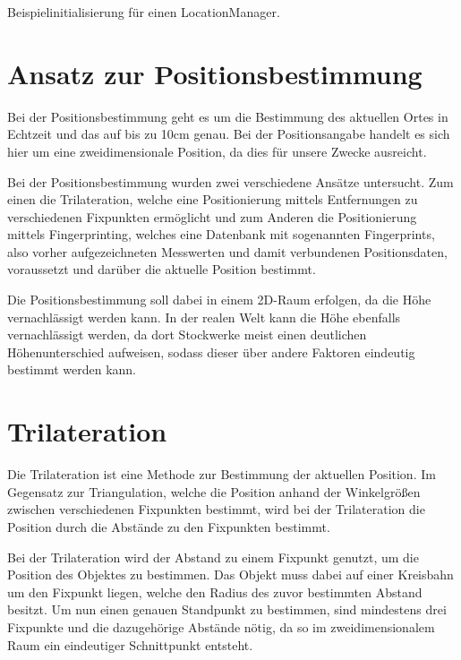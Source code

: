 \begin{listing}[htb!]
    \caption{Beispielinitialisierung für einen LocationManager.}
    \label{lst:locationmanager_objc}
\end{listing}

\section{Ansatz zur Positionsbestimmung}
\label{sec:implementation:positioning}
Bei der Positionsbestimmung geht es um die Bestimmung des aktuellen Ortes in Echtzeit und das auf bis zu 10cm genau. Bei der Positionsangabe handelt es sich hier um eine zweidimensionale Position, da dies für unsere Zwecke ausreicht.

Bei der Positionsbestimmung wurden zwei verschiedene Ansätze untersucht. Zum einen die Trilateration, welche eine Positionierung mittels Entfernungen zu verschiedenen Fixpunkten ermöglicht und zum Anderen die Positionierung mittels Fingerprinting, welches eine Datenbank mit sogenannten Fingerprints, also vorher aufgezeichneten Messwerten und damit verbundenen Positionsdaten, voraussetzt und darüber die aktuelle Position bestimmt.

Die Positionsbestimmung soll dabei in einem 2D-Raum erfolgen, da die Höhe vernachlässigt werden kann. In der realen Welt kann die Höhe ebenfalls vernachlässigt werden, da dort Stockwerke meist einen deutlichen Höhenunterschied aufweisen, sodass dieser über andere Faktoren eindeutig bestimmt werden kann.


\section{Trilateration}
\label{sec:implementation:trilateration}
Die Trilateration ist eine Methode zur Bestimmung der aktuellen Position. Im Gegensatz zur Triangulation, welche die Position anhand der Winkelgrößen zwischen verschiedenen Fixpunkten bestimmt, wird bei der Trilateration die Position durch die Abstände zu den Fixpunkten bestimmt. 

Bei der Trilateration wird der Abstand zu einem Fixpunkt genutzt, um die Position des Objektes zu bestimmen. Das Objekt muss dabei auf einer Kreisbahn um den Fixpunkt liegen, welche den Radius des zuvor bestimmten Abstand besitzt. Um nun einen genauen Standpunkt zu bestimmen, sind mindestens drei Fixpunkte und die dazugehörige Abstände nötig, da so im zweidimensionalem Raum ein eindeutiger Schnittpunkt entsteht.

